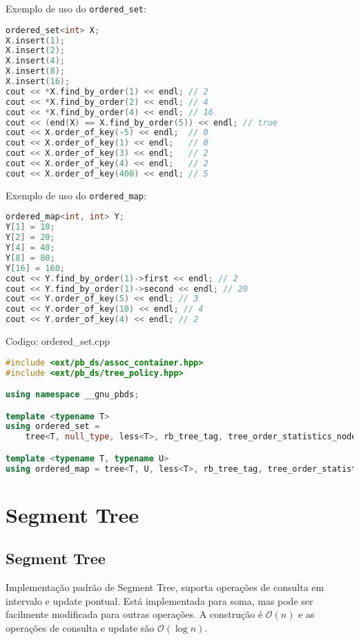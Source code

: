 \documentclass[10pt, a4paper, oneside]{book}
\begin{document}
Exemplo de uso do \texttt{ordered\_set}:



\begin{lstlisting}[language=C++]
ordered_set<int> X;
X.insert(1);
X.insert(2);
X.insert(4);
X.insert(8);
X.insert(16);
cout << *X.find_by_order(1) << endl; // 2
cout << *X.find_by_order(2) << endl; // 4
cout << *X.find_by_order(4) << endl; // 16
cout << (end(X) == X.find_by_order(5)) << endl; // true
cout << X.order_of_key(-5) << endl;  // 0
cout << X.order_of_key(1) << endl;   // 0
cout << X.order_of_key(3) << endl;   // 2
cout << X.order_of_key(4) << endl;   // 2
cout << X.order_of_key(400) << endl; // 5
\end{lstlisting}



Exemplo de uso do \texttt{ordered\_map}:



\begin{lstlisting}[language=C++]
ordered_map<int, int> Y;
Y[1] = 10;
Y[2] = 20;
Y[4] = 40;
Y[8] = 80;
Y[16] = 160;
cout << Y.find_by_order(1)->first << endl; // 2
cout << Y.find_by_order(1)->second << endl; // 20
cout << Y.order_of_key(5) << endl; // 3
cout << Y.order_of_key(10) << endl; // 4
cout << Y.order_of_key(4) << endl; // 2
\end{lstlisting}

\hfill

Codigo: ordered\_set.cpp

\begin{lstlisting}[language=C++]
#include <ext/pb_ds/assoc_container.hpp>
#include <ext/pb_ds/tree_policy.hpp>

using namespace __gnu_pbds;

template <typename T>
using ordered_set =
    tree<T, null_type, less<T>, rb_tree_tag, tree_order_statistics_node_update>;

template <typename T, typename U>
using ordered_map = tree<T, U, less<T>, rb_tree_tag, tree_order_statistics_node_update>;\end{lstlisting}
\hfill

\section{Segment Tree}
\subsection{Segment Tree}


Implementação padrão de Segment Tree, suporta operações de consulta em intervalo e update pontual. Está implementada para soma, mas pode ser facilmente modificada para outras operações. A construção é $\mathcal{O}(n)$ e as operações de consulta e update são $\mathcal{O}(\log n)$.
\end{document}
